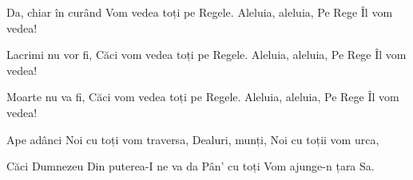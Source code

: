 
\beginverse
Da, chiar în curând
Vom vedea toți pe Regele.
Aleluia, aleluia,
Pe Rege Îl vom vedea!
\endverse

\beginverse
Lacrimi nu vor fi,
Căci vom vedea toți pe Regele.
Aleluia, aleluia,
Pe Rege Îl vom vedea!
\endverse

\beginverse
Moarte nu va fi,
Căci vom vedea toți pe Regele.
Aleluia, aleluia,
Pe Rege Îl vom vedea!
\endverse

\beginverse
Ape adânci
Noi cu toți vom traversa,
Dealuri, munți,
Noi cu toții vom urca,
\endverse

\beginverse
Căci Dumnezeu
Din puterea-I ne va da
Pân' cu toți
Vom ajunge-n țara Sa.
\endverse

\endsong
